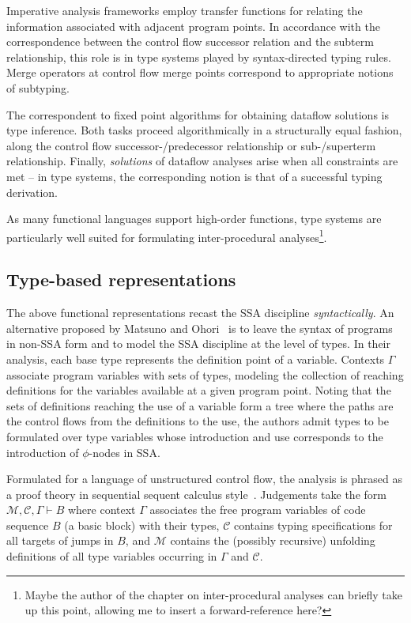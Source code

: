 Imperative analysis frameworks employ transfer functions for relating
the information associated with adjacent program points. In accordance
with the correspondence between the control flow successor relation and
the subterm relationship, this role is in type systems played by
syntax-directed typing rules. Merge operators at control flow merge
points correspond to appropriate notions of subtyping.

The correspondent to fixed point algorithms for obtaining dataflow
solutions is type inference. Both tasks proceed algorithmically in a
structurally equal fashion, along the control flow
successor-/predecessor relationship or sub-/superterm relationship.
Finally, \emph{solutions} of dataflow analyses arise when
all constraints are met -- in type systems, the corresponding notion is
that of a successful typing derivation.

As many functional languages support high-order functions, type
systems are particularly well suited for formulating inter-procedural
analyses\footnote{Maybe the author of the chapter on inter-procedural
analyses can briefly take up this point, allowing me to insert a
forward-reference here?}.

\subsection{Type-based representations}
The above functional representations recast the SSA discipline
\emph{syntactically}. An alternative proposed by Matsuno and
Ohori~\cite{DBLP:conf/ppdp/MatsunoO06} is to leave the syntax of
programs in non-SSA form and to model the SSA discipline at the level
of types. In their analysis, each base type represents the definition
point of a variable. Contexts $\Gamma$ associate program variables
with sets of types, modeling the collection of reaching definitions
for the variables available at a given program point. Noting that the
sets of definitions reaching the use of a variable form a tree where
the paths are the control flows from the definitions to the use, the
authors admit types to be formulated over type variables whose
introduction and use corresponds to the introduction of $\phi$-nodes
in SSA.
 
Formulated for a language of unstructured control flow, the analysis
is phrased as a proof theory in sequential sequent calculus
style~\cite{DBLP:journals/toplas/Ohori07}. Judgements take the form
$\mathcal{M}, \mathcal{C},
\Gamma \vdash B$ where context $\Gamma$ associates the free program
variables of code sequence $B$ (a basic block) with their types,
$\mathcal{C}$ contains typing specifications for all targets of jumps
in $B$, and $\mathcal{M}$ contains the (possibly recursive) unfolding
definitions of all type variables occurring in $\Gamma$ and
$\mathcal{C}$.

